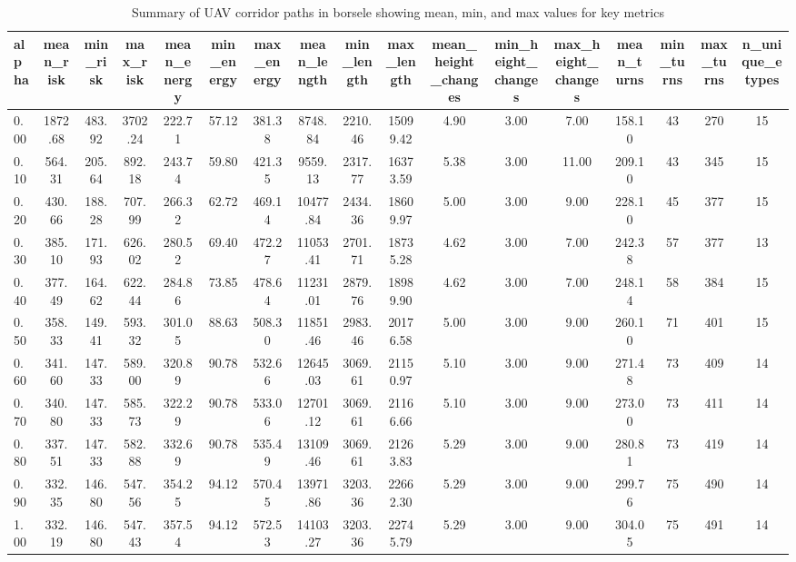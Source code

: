 \begin{table}
\caption{Summary of UAV corridor paths in borsele showing mean, min, and max values for key metrics}
\label{tab:borsele_summary_detailed}
\begin{tabular}{lcccccccccccccccc}
\toprule
alpha & mean_risk & min_risk & max_risk & mean_energy & min_energy & max_energy & mean_length & min_length & max_length & mean_height_changes & min_height_changes & max_height_changes & mean_turns & min_turns & max_turns & n_unique_etypes \\
\midrule
0.00 & 1872.68 & 483.92 & 3702.24 & 222.71 & 57.12 & 381.38 & 8748.84 & 2210.46 & 15099.42 & 4.90 & 3.00 & 7.00 & 158.10 & 43 & 270 & 15 \\
0.10 & 564.31 & 205.64 & 892.18 & 243.74 & 59.80 & 421.35 & 9559.13 & 2317.77 & 16373.59 & 5.38 & 3.00 & 11.00 & 209.10 & 43 & 345 & 15 \\
0.20 & 430.66 & 188.28 & 707.99 & 266.32 & 62.72 & 469.14 & 10477.84 & 2434.36 & 18609.97 & 5.00 & 3.00 & 9.00 & 228.10 & 45 & 377 & 15 \\
0.30 & 385.10 & 171.93 & 626.02 & 280.52 & 69.40 & 472.27 & 11053.41 & 2701.71 & 18735.28 & 4.62 & 3.00 & 7.00 & 242.38 & 57 & 377 & 13 \\
0.40 & 377.49 & 164.62 & 622.44 & 284.86 & 73.85 & 478.64 & 11231.01 & 2879.76 & 18989.90 & 4.62 & 3.00 & 7.00 & 248.14 & 58 & 384 & 15 \\
0.50 & 358.33 & 149.41 & 593.32 & 301.05 & 88.63 & 508.30 & 11851.46 & 2983.46 & 20176.58 & 5.00 & 3.00 & 9.00 & 260.10 & 71 & 401 & 15 \\
0.60 & 341.60 & 147.33 & 589.00 & 320.89 & 90.78 & 532.66 & 12645.03 & 3069.61 & 21150.97 & 5.10 & 3.00 & 9.00 & 271.48 & 73 & 409 & 14 \\
0.70 & 340.80 & 147.33 & 585.73 & 322.29 & 90.78 & 533.06 & 12701.12 & 3069.61 & 21166.66 & 5.10 & 3.00 & 9.00 & 273.00 & 73 & 411 & 14 \\
0.80 & 337.51 & 147.33 & 582.88 & 332.69 & 90.78 & 535.49 & 13109.46 & 3069.61 & 21263.83 & 5.29 & 3.00 & 9.00 & 280.81 & 73 & 419 & 14 \\
0.90 & 332.35 & 146.80 & 547.56 & 354.25 & 94.12 & 570.45 & 13971.86 & 3203.36 & 22662.30 & 5.29 & 3.00 & 9.00 & 299.76 & 75 & 490 & 14 \\
1.00 & 332.19 & 146.80 & 547.43 & 357.54 & 94.12 & 572.53 & 14103.27 & 3203.36 & 22745.79 & 5.29 & 3.00 & 9.00 & 304.05 & 75 & 491 & 14 \\
\bottomrule
\end{tabular}
\end{table}
